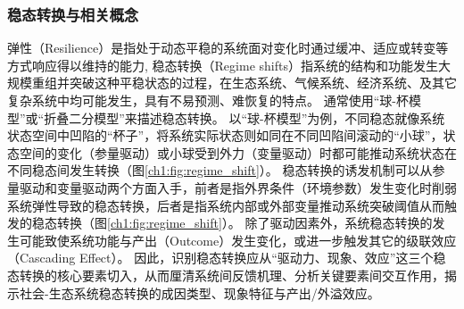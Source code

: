 
\subsubsection{稳态转换与相关概念}

弹性（Resilience）是指处于动态平稳的系统面对变化时通过缓冲、适应或转变等方式响应得以维持的能力\cite{folke2010}, 稳态转换（Regime shifts）指系统的结构和功能发生大规模重组并突破这种平稳状态的过程\cite{scheffer2001}，在生态系统、气候系统、经济系统、及其它复杂系统中均可能发生，具有不易预测、难恢复的特点\cite{scheffer2003, biggs2009}。
通常使用“球-杯模型”或“折叠二分模型”来描述稳态转换。
以“球-杯模型”为例，不同稳态就像系统状态空间中凹陷的“杯子”，将系统实际状态则如同在不同凹陷间滚动的“小球”，状态空间的变化（参量驱动）或小球受到外力（变量驱动）时都可能推动系统状态在不同稳态间发生转换\cite{scheffer2009, folke2010}（图\ref{ch1:fig:regime_shift}）。
稳态转换的诱发机制可以从参量驱动和变量驱动两个方面入手，前者是指外界条件（环境参数）发生变化时削弱系统弹性导致的稳态转换，后者是指系统内部或外部变量推动系统突破阈值从而触发的稳态转换\cite{scheffer2009, folke2010}（图\ref{ch1:fig:regime_shift}）。
除了驱动因素外，系统稳态转换的发生可能致使系统功能与产出（Outcome）发生变化，或进一步触发其它的级联效应（Cascading Effect）\cite{rocha2018}。
因此，识别稳态转换应从“驱动力、现象、效应”这三个稳态转换的核心要素切入，从而厘清系统间反馈机理、分析关键要素间交互作用，揭示社会-生态系统稳态转换的成因类型、现象特征与产出/外溢效应。

